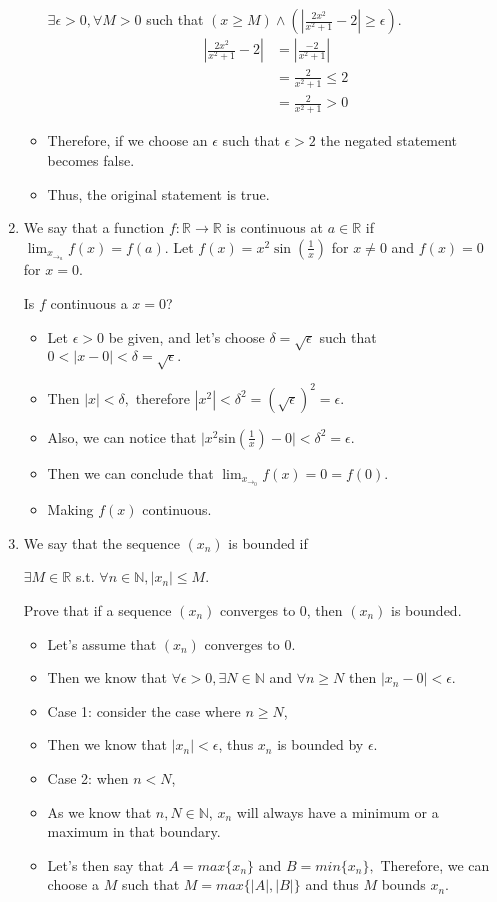 \documentclass[letterpaper,12pt]{article}
\begin{document}
\begin{enumerate}
\begin{itemize}
	$ \exists \epsilon>0, \forall M>0$ such that $(x \geq M) \wedge ( |\frac{2x^2}{x^2+1}-2| \geq \epsilon)$.
	\begin{align}
		|\frac{2x^2}{x^2+1}-2| &= |\frac{-2}{x^2+1}| \\&=\frac{2}{x^2+1} \leq2 \\
		&=\frac{2}{x^2+1}>0
	\end{align}
	\item Therefore, if we choose an $\epsilon$ such that $\epsilon >2$ the negated statement becomes false.
	\item Thus, the original statement is true.
\end{itemize}

\item We say that a function $f: \mathbb{R} \rightarrow \mathbb{R}$ is continuous at $ a \in \mathbb{R}$ if $\lim_x_\rightarrow _a f(x) =f(a)$. Let $f(x) = x^2\sin(\frac{1}{x})$ for $x \neq 0$ and $f(x)=0$ for $x=0$.

Is $f$ continuous a $x=0$?
\begin{itemize}
	\item Let $\epsilon >0$ be given, and let's choose $\delta = \sqrt \epsilon$ such that $ 0<|x-0|< \delta = \sqrt \epsilon.$
	\item Then $ |x| <\delta ,$ therefore $|x^2|<\delta^2 = (\sqrt \epsilon)^2= \epsilon$.
	\item Also, we can notice that $|x^2$sin$(\frac{1}{x})-0|<\delta^2 = \epsilon$.
	\item Then we can conclude that $ \lim_x_\rightarrow_0f(x) =0=f(0)$.
	\item Making $f(x)$ continuous.
\end{itemize}
\item We say that the sequence $(x_n)$ is bounded if 
\begin{center}
	$\exists M \in \mathbb{R}$ s.t. $\forall n \in \mathbb{N},|x_n| \leq M$.
\end{center}
Prove that if a sequence $(x_n)$ converges to 0, then $(x_n)$ is bounded.
\begin{itemize}
	\item Let's assume that $(x_n)$ converges to 0.
	\item Then we know that $\forall \epsilon>0, \exists N \in \mathbb{N}$ and $\forall n \geq N$ then $|x_n-0| < \epsilon$.
	\item Case 1: consider the case where $n \geq N$, 
	\item Then we know that $|x_n|< \epsilon$, thus $x_n$ is bounded by $\epsilon$.
	\item Case 2: when $n < N$,
	\item As we know that $n,N \in \mathbb{N}$, $x_n$ will always have a minimum or a maximum in that boundary.
	\item Let's then say that $ A=max\{x_n\}$ and $B=min\{x_n\},$ Therefore, we can choose a $M$ such that $M=max\{|A|,|B|\}$ and thus $M$ bounds $x_n$.
	

\end{itemize}
\end{enumerate}
\end{document}
